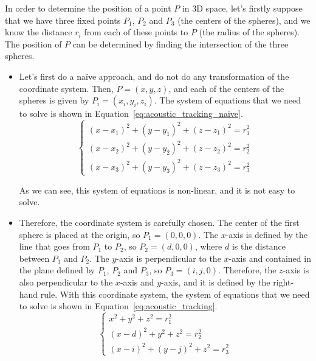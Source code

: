 In order to determine the position of a point $P$ in 3D space, let's firstly suppose that we have three fixed points $P_1$, $P_2$ and $P_3$ (the centers of the spheres), and we know the distance $r_i$ from each of these points to $P$ (the radius of the spheres). The position of $P$ can be determined by finding the intersection of the three spheres.
\begin{itemize}
    \item Let's first do a naïve approach, and do not do any transformation of the coordinate system. Then, $P=(x,y,z)$, and each of the centers of the spheres is given by $P_i=(x_i,y_i,z_i)$. The system of equations that we need to solve is shown in Equation~\eqref{eq:acoustic_tracking_naive}.
    \begin{equation}
        \begin{cases}
            (x-x_1)^2+(y-y_1)^2+(z-z_1)^2=r_1^2\\
            (x-x_2)^2+(y-y_2)^2+(z-z_2)^2=r_2^2\\
            (x-x_3)^2+(y-y_3)^2+(z-z_3)^2=r_3^2
        \end{cases}
        \label{eq:acoustic_tracking_naive}
    \end{equation}

    As we can see, this system of equations is non-linear, and it is not easy to solve.

    \item Therefore, the coordinate system is carefully chosen. The center of the first sphere is placed at the origin, so $P_1=(0,0,0)$. The $x$-axis is defined by the line that goes from $P_1$ to $P_2$, so $P_2=(d,0,0)$, where $d$ is the distance between $P_1$ and $P_2$. The $y$-axis is perpendicular to the $x$-axis and contained in the plane defined by $P_1$, $P_2$ and $P_3$, so $P_3=(i,j,0)$. Therefore, the $z$-axis is also perpendicular to the $x$-axis and $y$-axis, and it is defined by the right-hand rule. With this coordinate system, the system of equations that we need to solve is shown in Equation~\eqref{eq:acoustic_tracking}.
    \begin{equation}
        \begin{cases}
            x^2+y^2+z^2=r_1^2\\
            (x-d)^2+y^2+z^2=r_2^2\\
            (x-i)^2+(y-j)^2+z^2=r_3^2
        \end{cases}
        \label{eq:acoustic_tracking}
    \end{equation}


\end{itemize}
